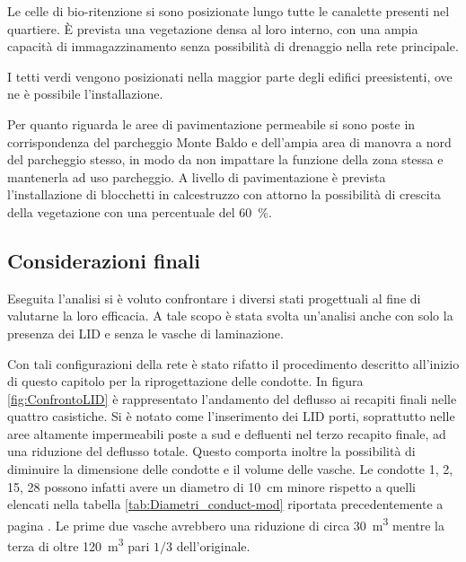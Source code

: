 Le celle di bio-ritenzione si sono posizionate lungo tutte le canalette presenti nel quartiere. 
È prevista una vegetazione densa al loro interno, con una ampia capacità di immagazzinamento senza possibilità di drenaggio nella rete principale.

I tetti verdi vengono posizionati nella maggior parte degli edifici preesistenti, ove ne è possibile l'installazione. 

Per quanto riguarda le aree di pavimentazione permeabile si sono poste in corrispondenza del parcheggio Monte Baldo e dell'ampia area di manovra a nord del parcheggio stesso, in modo da non impattare la funzione della zona stessa e mantenerla ad uso parcheggio.
A livello di pavimentazione è prevista l'installazione di blocchetti in calcestruzzo con attorno la possibilità di crescita della vegetazione con una percentuale del \SI{60}{\percent}.

\subsection{Considerazioni finali}
Eseguita l'analisi si è voluto confrontare i diversi stati progettuali al fine di valutarne la loro  efficacia. 
A tale scopo è stata svolta un'analisi anche con solo la presenza dei LID e senza le vasche di laminazione.

Con tali configurazioni della rete è stato rifatto il procedimento descritto all'inizio di questo capitolo per la riprogettazione delle condotte. 
In figura \ref{fig:ConfrontoLID} è rappresentato l'andamento del deflusso ai recapiti finali nelle quattro casistiche.
Si è notato come l'inserimento dei LID porti, soprattutto nelle aree altamente impermeabili poste a sud e defluenti nel terzo recapito finale, ad una riduzione del deflusso totale. 
Questo comporta inoltre la possibilità di diminuire la dimensione delle condotte e il volume delle vasche. Le condotte 1, 2, 15, 28 possono infatti avere un diametro di \SI{10}{\centi\metre} minore rispetto a quelli elencati nella tabella \ref{tab:Diametri_conduct-mod} riportata precedentemente a pagina \pageref{tab:Diametri_conduct-mod}. 
Le prime due vasche avrebbero una riduzione di circa \SI{30}{\metre\cubed} mentre la terza di oltre \SI{120}{\metre\cubed} pari $1/3$ dell'originale.




